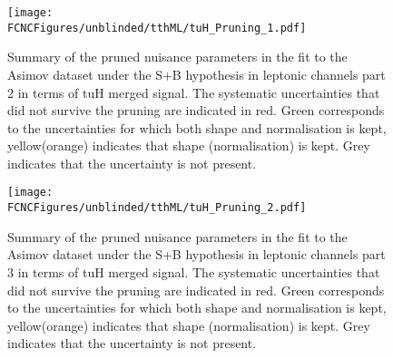 \begin{figure}[htb]
\centering
\texttt{[image: \\FCNCFigures/unblinded/tthML/tuH\_Pruning\_1.pdf]}
\caption{ Summary of the pruned nuisance parameters in the fit to the  Asimov dataset under the S+B hypothesis in leptonic channels part 2 in terms of tuH merged signal. The systematic uncertainties that did not survive the pruning are indicated in red. Green corresponds to the uncertainties for which both shape and normalisation is kept, yellow(orange) indicates that shape (normalisation) is kept. Grey indicates that the uncertainty is not present. }
\label{fig:tthML_pruning_1}
\end{figure}

\begin{figure}[htb]
\centering
\texttt{[image: \\FCNCFigures/unblinded/tthML/tuH\_Pruning\_2.pdf]}
\caption{ Summary of the pruned nuisance parameters in the fit to the  Asimov dataset under the S+B hypothesis in leptonic channels part 3 in terms of tuH merged signal. The systematic uncertainties that did not survive the pruning are indicated in red. Green corresponds to the uncertainties for which both shape and normalisation is kept, yellow(orange) indicates that shape (normalisation) is kept. Grey indicates that the uncertainty is not present.}
\label{fig:tthML_pruning_2}
\end{figure}


